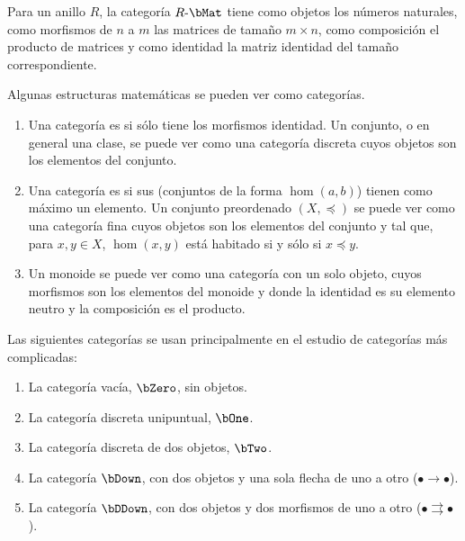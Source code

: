 \begin{example}
  Para un anillo $R$, la categoría $R\dash\bMat$ tiene como objetos los números
  naturales, como morfismos de $n$ a $m$ las matrices de tamaño $m\times n$,
  como composición el producto de matrices y como identidad la matriz identidad
  del tamaño correspondiente.
\end{example}

\begin{samepage}
  \begin{example}
    Algunas estructuras matemáticas se pueden ver como categorías.
    \begin{enumerate}
    \item Una categoría es  si sólo tiene los morfismos
      identidad. Un conjunto, o en general una clase, se puede ver como una
      categoría discreta cuyos objetos son los elementos del conjunto.
    \item Una categoría es  si sus  (conjuntos de
      la forma $\hom(a,b)$) tienen como máximo un elemento. Un conjunto
      preordenado $(X,\preceq)$ se puede ver como una categoría fina cuyos
      objetos son los elementos del conjunto y tal que, para $x,y\in X$,
      $\hom(x,y)$ está habitado si y sólo si $x\preceq y$.
    \item Un monoide se puede ver como una categoría con un solo objeto, cuyos
      morfismos son los elementos del monoide y donde la identidad es su
      elemento neutro y la composición es el producto.
    \end{enumerate}
  \end{example}
\end{samepage}

\begin{example}
  Las siguientes categorías se usan principalmente en el estudio de categorías
  más complicadas:
  \begin{enumerate}
  \item La categoría vacía, $\bZero$, sin objetos.
  \item La categoría discreta unipuntual, $\bOne$.
  \item La categoría discreta de dos objetos, $\bTwo$.
  \item La categoría $\bDown$, con dos objetos y una sola flecha de uno a otro
    ($\bullet\to\bullet$).
  \item La categoría $\bDDown$, con dos objetos y dos morfismos de uno
    a otro ($\bullet\rightrightarrows\bullet$).
  \end{enumerate}
\end{example}


